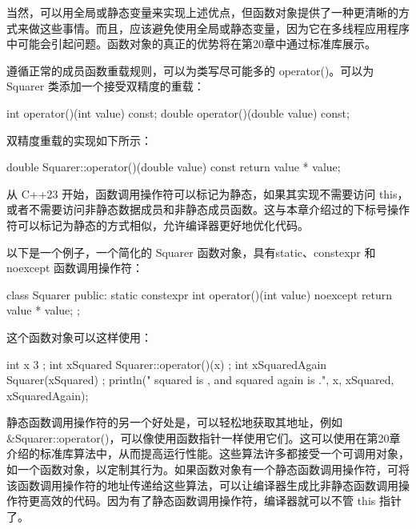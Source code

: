 当然，可以用全局或静态变量来实现上述优点，但函数对象提供了一种更清晰的方式来做这些事情。而且，应该避免使用全局或静态变量，因为它在多线程应用程序中可能会引起问题。函数对象的真正的优势将在第20章中通过标准库展示。

遵循正常的成员函数重载规则，可以为类写尽可能多的 operator()。可以为 Squarer 类添加一个接受双精度的重载：

\begin{cpp}
int operator()(int value) const;
double operator()(double value) const;
\end{cpp}

双精度重载的实现如下所示：

\begin{cpp}
double Squarer::operator()(double value) const { return value * value; }
\end{cpp}



从 C++23 开始，函数调用操作符可以标记为静态，如果其实现不需要访问 this，或者不需要访问非静态数据成员和非静态成员函数。这与本章介绍过的下标号操作符可以标记为静态的方式相似，允许编译器更好地优化代码。

以下是一个例子，一个简化的 Squarer 函数对象，具有static、constexpr 和 noexcept 函数调用操作符：

\begin{cpp}
class Squarer
{
    public:
        static constexpr int operator()(int value) noexcept
        {
            return value * value;
        }
};
\end{cpp}

这个函数对象可以这样使用：

\begin{cpp}
int x { 3 };
int xSquared { Squarer::operator()(x) };
int xSquaredAgain { Squarer{}(xSquared) };
println("{} squared is {}, and squared again is {}.", x, xSquared, xSquaredAgain);
\end{cpp}

静态函数调用操作符的另一个好处是，可以轻松地获取其地址，例如 \&Squarer::operator()，可以像使用函数指针一样使用它们。这可以使用在第20章介绍的标准库算法中，从而提高运行性能。这些算法许多都接受一个可调用对象，如一个函数对象，以定制其行为。如果函数对象有一个静态函数调用操作符，可将该函数调用操作符的地址传递给这些算法，可以让编译器生成比非静态函数调用操作符更高效的代码。因为有了静态函数调用操作符，编译器就可以不管 this 指针了。






















